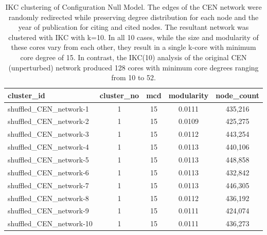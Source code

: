 \documentclass[11pt, oneside]{article}   	%
\begin{document}
\begin{table}[ht]
\centering
\captionsetup{width=\textwidth}
\caption{IKC clustering of Configuration Null Model. The edges of the CEN network were randomly redirected while preserving degree distribution for each node and the year of publication for citing and cited nodes. 
The resultant network was clustered with IKC with k=10.  In all 10 cases, while the size and modularity of these cores vary from each other, they result in a single k-core with minimum core degree of 15. In contrast, the IKC(10) analysis of the original CEN (unperturbed) network produced 128 cores  with minimum core degrees ranging from 10 to 52.}
\begin{tabular}{lcccc}
  \hline
cluster\_id & cluster\_no & mcd & modularity & node\_count  \\ 
  \hline
shuffled\_CEN\_network-1 &     1 &    15 & 0.0111 & 435,216 \\
shuffled\_CEN\_network-2 &     1 &    15 & 0.0109 & 425,275 \\
shuffled\_CEN\_network-3 &     1 &    15 & 0.0112 & 443,254 \\
shuffled\_CEN\_network-4 &     1 &    15 & 0.0113 & 440,106 \\
shuffled\_CEN\_network-5 &     1 &    15 & 0.0113 & 448,858 \\
shuffled\_CEN\_network-6 &     1 &    15 & 0.0113 & 432,842 \\
shuffled\_CEN\_network-7 &     1 &    15 & 0.0113 & 446,305 \\
shuffled\_CEN\_network-8 &     1 &    15 & 0.0112 & 436,192 \\
shuffled\_CEN\_network-9 &     1 &    15 & 0.0111 & 424,074 \\
shuffled\_CEN\_network-10 &    1 &   15 & 0.0111 & 436,273 \\ 
   \hline
\end{tabular}
\label{tab:tab1}
\end{table}
\end{document}
